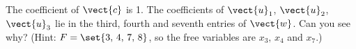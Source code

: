 The coefficient of $\vect{c}$ is 1.  The coefficients of $\vect{u}_1$, $\vect{u}_2$, $\vect{u}_3$ lie in the third, fourth and seventh entries of $\vect{w}$.  Can you see why?  (Hint:  $F=\set{3,\,4,\,7,\,8}$, so the free variables are $x_3,\,x_4$ and $x_7$.)